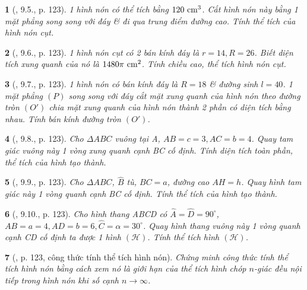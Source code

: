 \documentclass{article}
\newtheorem{baitoan}{}
\begin{document}
\begin{baitoan}[\cite{Binh_boi_duong_Toan_9_tap_2}, 9.5., p. 123]
	1 hình nón có thể tích bằng $\rm120\ cm^3$. Cắt hình nón này bằng 1 mặt phẳng song song với đáy \& đi qua trung điểm đường cao. Tính thể tích của hình nón cụt.
\end{baitoan}

\begin{baitoan}[\cite{Binh_boi_duong_Toan_9_tap_2}, 9.6., p. 123]
	1 hình nón cụt có 2 bán kính đáy là $r = 14,R = 26$. Biết diện tích xung quanh của nó là $\rm1480\pi\ cm^2$. Tính chiều cao, thể tích hình nón cụt.
\end{baitoan}

\begin{baitoan}[\cite{Binh_boi_duong_Toan_9_tap_2}, 9.7., p. 123]
	1 hình nón có bán kính đáy là $R = 18$ \& đường sinh $l = 40$. 1 mặt phẳng $(P)$ song song với đáy cắt mặt xung quanh của hình nón theo đường tròn $(O')$ chia mặt xung quanh của hình nón thành 2 phần có diện tích bằng nhau. Tính bán kính đường tròn $(O')$.
\end{baitoan}

\begin{baitoan}[\cite{Binh_boi_duong_Toan_9_tap_2}, 9.8., p. 123]
	Cho $\Delta ABC$ vuông tại A, $AB = c = 3,AC = b = 4$. Quay tam giác vuông này 1 vòng xung quanh cạnh BC cố định. Tính diện tích toàn phần, thể tích của hình tạo thành.
\end{baitoan}

\begin{baitoan}[\cite{Binh_boi_duong_Toan_9_tap_2}, 9.9., p. 123]
	Cho $\Delta ABC$, $\widehat{B}$ tù, $BC = a$, đường cao $AH = h$. Quay hình tam giác này 1 vòng quanh cạnh BC cố định. Tính thể tích của hình tạo thành.
\end{baitoan}

\begin{baitoan}[\cite{Binh_boi_duong_Toan_9_tap_2}, 9.10., p. 123]
	Cho hình thang ABCD có $\widehat{A} = \widehat{D} = 90^\circ$, $AB = a = 4,AD = b = 6,\widehat{C} = \alpha = 30^\circ$. Quay hình thang vuông này 1 vòng quanh cạnh CD cố định ta được 1 hình $(\mathcal{H})$. Tính thể tích hình $(\mathcal{H})$.
\end{baitoan}

\begin{baitoan}[\cite{Binh_boi_duong_Toan_9_tap_2}, p. 123, công thức tính thể tích hình nón]
	Chứng minh công thức tính thể tích hình nón bằng cách xem nó là giới hạn của thể tích hình chóp $n$-giác đều nội tiếp trong hình nón khi số cạnh $n\to\infty$.
\end{baitoan}
\end{document}
